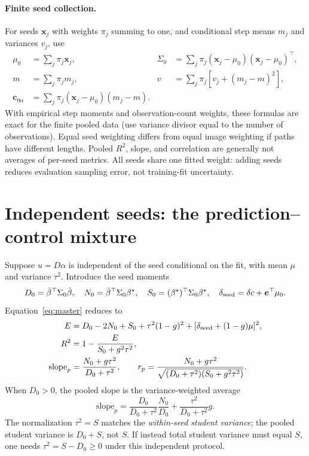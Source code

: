 \documentclass[11pt]{article}
\newcommand{\bstar}{{\beta^{\star}}}
\newcommand{\bhat}{\hat{\beta}}
\newcommand{\x}{\mathbf{x}}
\begin{document}
\paragraph{Finite seed collection.}
For seeds $\x_j$ with weights $\pi_j$ summing to one, and conditional
step means $m_j$ and variances $v_j$, use
\begin{align}
 \mu_0&=\sum_j\pi_j\x_j,&
 \Sigma_0&=\sum_j\pi_j(\x_j-\mu_0)(\x_j-\mu_0)^\top,\\
 m&=\sum_j\pi_jm_j,&
 v&=\sum_j\pi_j[v_j+(m_j-m)^2],\\
 \bm c_{0\alpha}&=\sum_j\pi_j(\x_j-\mu_0)(m_j-m).
\end{align}
With empirical step moments and observation-count weights, these formulas
are exact for the finite pooled data (use variance divisor equal to the
number of observations). Equal seed weighting differs from equal image
weighting if paths have different lengths. Pooled $R^2$, slope, and
correlation are generally not averages of per-seed metrics. All seeds share
one fitted weight: adding seeds reduces evaluation sampling error, not
training-fit uncertainty.

\section{Independent seeds: the prediction--control mixture}
Suppose $u=D\alpha$ is independent of the seed conditional on the fit, with
mean $\mu$ and variance $\tau^2$. Introduce the seed moments
\[
 D_0=\bhat^\top \Sigma_0\bhat,\quad N_0=\bhat^\top \Sigma_0\bstar,\quad
 S_0=(\bstar)^\top \Sigma_0\bstar,\quad
 \delta_{\rm seed}=\delta c+\bm e^\top\mu_0.
\]
Equation~\eqref{eq:master} reduces to
\begin{align}
 E&=D_0-2N_0+S_0+\tau^2(1-g)^2
           +[\delta_{\rm seed}+(1-g)\mu]^2,\label{eq:ind-mse}\\
 R^2&=1-\frac{E}{S_0+g^2\tau^2},\\
 \mathrm{slope}_p&=\frac{N_0+g\tau^2}{D_0+\tau^2},\qquad
 r_p=\frac{N_0+g\tau^2}
 {\sqrt{(D_0+\tau^2)(S_0+g^2\tau^2)}}.\label{eq:ind-corr}
\end{align}
When $D_0>0$, the pooled slope is the variance-weighted average
\[
 \mathrm{slope}_p=\frac{D_0}{D_0+\tau^2}\frac{N_0}{D_0}
       +\frac{\tau^2}{D_0+\tau^2}g.
\]
The normalization $\tau^2=S$ matches the \emph{within-seed student variance};
the pooled student variance is $D_0+S$, not $S$.
If instead total student variance must equal $S$, one needs
$\tau^2=S-D_0\geq0$ under this independent protocol.
\end{document}
